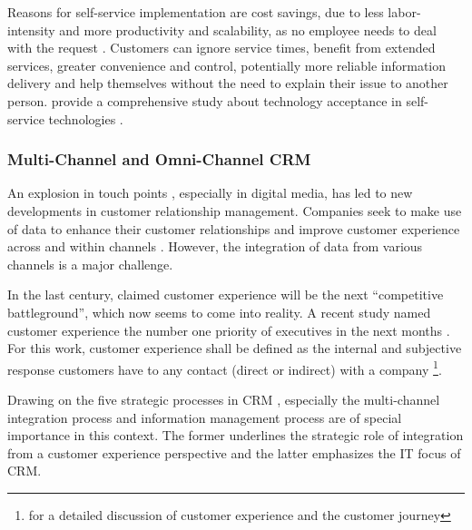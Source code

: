 		Reasons for self-service implementation are cost savings, due to less labor-intensity and more productivity and scalability, as no employee needs to deal with the request \citep{Walker_2002, Walker_2003}. Customers can ignore service times, benefit from extended services, greater convenience and control, potentially more reliable information delivery and help themselves without the need to explain their issue to another person. \citeauthor{Blut_2016} provide a comprehensive study about technology acceptance in self-service technologies \citep{Blut_2016}. 
		
	\subsubsection{Multi-Channel and Omni-Channel CRM}
		An explosion in touch points \citep{Lemon_2016}, especially in digital media, has led to new developments in customer relationship management. Companies seek to make use of data to enhance their customer relationships and improve customer experience across and within channels \citep{Frow_2007}. However, the integration of data from various channels is a major challenge. 
		
		In the last century, \citeauthor{gilmore1998} claimed customer experience will be the next \enquote{competitive battleground}, which now seems to come into reality. A recent study named customer experience the number one priority of executives in the next months \citep{accenture2015}. For this work, customer experience shall be defined as the internal and subjective response customers have to any contact (direct or indirect) with a company \citep{meyer2007customer}\footnote{\cf \cite{Lemon_2016} for a detailed discussion of customer experience and the customer journey }.
		
		Drawing on the five strategic processes in \acrshort{CRM} \citep{payne2004role}, especially the multi-channel integration process and information management process are of special importance in this context. The former underlines the strategic role of integration from a customer experience perspective and the latter emphasizes the IT focus of CRM. 
		
